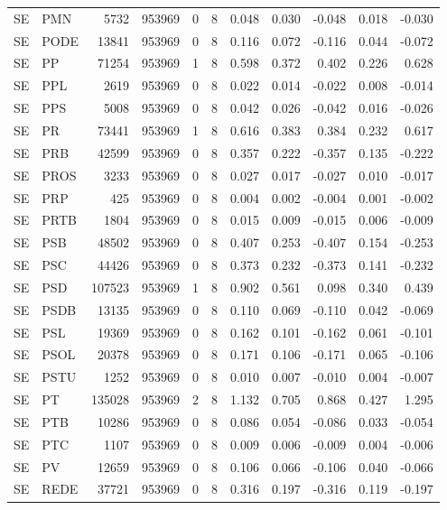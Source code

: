 \begin{landscape}
\begin{longtable}{llrrrrrrrrr}
SE & PMN & 5732 & 953969 & 0 & 8 & 0.048 & 0.030 & -0.048 & 0.018 & -0.030 \\
SE & PODE & 13841 & 953969 & 0 & 8 & 0.116 & 0.072 & -0.116 & 0.044 & -0.072 \\
SE & PP & 71254 & 953969 & 1 & 8 & 0.598 & 0.372 & 0.402 & 0.226 & 0.628 \\
SE & PPL & 2619 & 953969 & 0 & 8 & 0.022 & 0.014 & -0.022 & 0.008 & -0.014 \\
SE & PPS & 5008 & 953969 & 0 & 8 & 0.042 & 0.026 & -0.042 & 0.016 & -0.026 \\
SE & PR & 73441 & 953969 & 1 & 8 & 0.616 & 0.383 & 0.384 & 0.232 & 0.617 \\
SE & PRB & 42599 & 953969 & 0 & 8 & 0.357 & 0.222 & -0.357 & 0.135 & -0.222 \\
SE & PROS & 3233 & 953969 & 0 & 8 & 0.027 & 0.017 & -0.027 & 0.010 & -0.017 \\
SE & PRP & 425 & 953969 & 0 & 8 & 0.004 & 0.002 & -0.004 & 0.001 & -0.002 \\
SE & PRTB & 1804 & 953969 & 0 & 8 & 0.015 & 0.009 & -0.015 & 0.006 & -0.009 \\
SE & PSB & 48502 & 953969 & 0 & 8 & 0.407 & 0.253 & -0.407 & 0.154 & -0.253 \\
SE & PSC & 44426 & 953969 & 0 & 8 & 0.373 & 0.232 & -0.373 & 0.141 & -0.232 \\
SE & PSD & 107523 & 953969 & 1 & 8 & 0.902 & 0.561 & 0.098 & 0.340 & 0.439 \\
SE & PSDB & 13135 & 953969 & 0 & 8 & 0.110 & 0.069 & -0.110 & 0.042 & -0.069 \\
SE & PSL & 19369 & 953969 & 0 & 8 & 0.162 & 0.101 & -0.162 & 0.061 & -0.101 \\
SE & PSOL & 20378 & 953969 & 0 & 8 & 0.171 & 0.106 & -0.171 & 0.065 & -0.106 \\
SE & PSTU & 1252 & 953969 & 0 & 8 & 0.010 & 0.007 & -0.010 & 0.004 & -0.007 \\
SE & PT & 135028 & 953969 & 2 & 8 & 1.132 & 0.705 & 0.868 & 0.427 & 1.295 \\
SE & PTB & 10286 & 953969 & 0 & 8 & 0.086 & 0.054 & -0.086 & 0.033 & -0.054 \\
SE & PTC & 1107 & 953969 & 0 & 8 & 0.009 & 0.006 & -0.009 & 0.004 & -0.006 \\
SE & PV & 12659 & 953969 & 0 & 8 & 0.106 & 0.066 & -0.106 & 0.040 & -0.066 \\
SE & REDE & 37721 & 953969 & 0 & 8 & 0.316 & 0.197 & -0.316 & 0.119 & -0.197 \\

\end{longtable}
\end{landscape}
